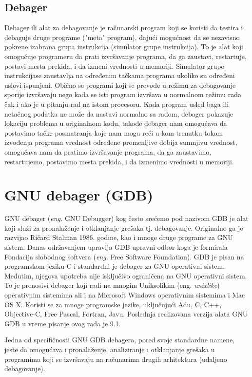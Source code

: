 \documentclass[a4paper]{article}
\begin{document}
\subsection{Debager}
\label{subsec:debager}
Debager ili alat za debagovanje je računarski program koji se koristi da testira i 
debaguje druge programe ("meta" program), dajući mogućnost da se nezavisno 
pokrene izabrana grupa instrukcija (simulator grupe instrukcija).
To je alat koji omogućuje programeru da prati izvršavanje 
programa, da ga zaustavi, restartuje, postavi mesta prekida, i da
izmeni vrednosti u memoriji. Simulator grupe instrukcijase zaustavlja
na određenim tačkama programa ukoliko su određeni uslovi ispunjeni.
Obično se programi koji se prevode u režimu za debagovanje
sporije izvršavaju nego kada se isti program izvršava u normalnom režimu rada čak i ako je 
u pitanju rad na istom procesoru. \cite{debugger} Kada program usled baga ili netačnog podatka ne može da 
nastavi normalno sa radom, debager pokazuje lokaciju problema u originalnom kodu, takođe
debager nam omogućava da postavimo tačke posmatranja koje nam
mogu reći u kom trenutku tokom izvođenja programa vrednost
određene promenljive dobija sumnjivu vrednost, omogućava nam da
pratimo izvršavanje programa, da ga zaustavimo, restartujemo,
postavimo mesta prekida, i da izmenimo vrednosti u memoriji. 

\section{GNU debager (GDB)}
\label{sec:GDB}
GNU debager (\textit{eng.} GNU Debugger) kog često srećemo pod nazivom GDB je alat koji služi za pronalaženje 
i otklanjanje grešaka tj. debagovanje. Originalno ga je razvijao Ričard Stalman 1986. godine, kao i mnoge druge programe za GNU sistem\cite{gdb}. Danas održavanjem upravlja GDB upravni odbor koga je formirala Fondacija 
slobodnog softvera (\textit{eng.} Free Software Foundation).
GDB je pisan na programskom jeziku C i standardni je debager za GNU operativni sistem. 
Međutim, njegova upotreba nije isključivo ograničena na GNU operativni sistem. To je prenosivi debager
koji radi na mnogim Uniksolikim (eng. \textit{unixlike}) operativnim sistemima ali i na Microsoft Windows operativnim 
sistemima i Mac OS X. Koristi se za mnoge programske jezike, uključujući
Adu, C, C++, Objective-C, Free Pascal, Fortran, Javu.
Poslednja realizovana verzija alata GNU GDB u vreme pisanje ovog rada je 9.1. \cite{sourceware}

Jedna od specifičnosti GNU GDB debagera, pored svoje standardne namene, jeste da omogućava i 
pronalaženje, analiziranje i otklanjanje grešaka u programima koji se izvršavaju na računarima drugih 
arhitektura (udaljeno debagovanje)\cite{master_rad}.
\end{document}

